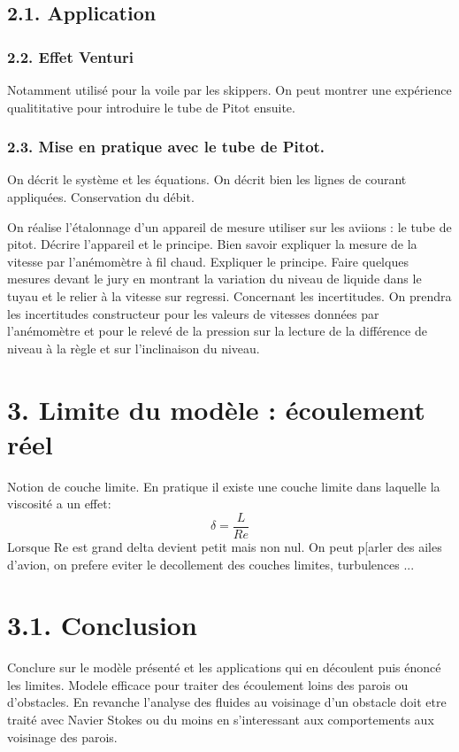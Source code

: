 \documentclass[french, a4paper, 10pt, twocolumn, landscape]{article}
\begin{document}
\subsection*{2.1. Application}

\subsubsection*{2.2. Effet Venturi}

Notamment utilisé pour la voile par les skippers. On peut montrer une expérience qualititative pour introduire le tube de Pitot ensuite.

\subsubsection*{2.3. Mise en pratique avec le tube de Pitot.}
 On décrit le système et les équations. On décrit bien les lignes de courant appliquées. Conservation du débit.

On réalise l'étalonnage d'un appareil de mesure utiliser sur les aviions : le tube de pitot. Décrire l'appareil et le principe. Bien savoir expliquer la mesure de la vitesse par l'anémomètre à fil chaud. Expliquer le principe.  Faire quelques mesures devant le jury en montrant la variation du niveau de liquide dans le tuyau et le relier à la vitesse sur regressi. Concernant les incertitudes. On prendra les incertitudes constructeur pour les valeurs de vitesses données par l'anémomètre et pour le relevé de la pression sur la lecture de la différence de niveau à la règle et sur l'inclinaison du niveau.

\section*{3. Limite du modèle : écoulement réel}
Notion de couche limite. En pratique il existe une couche limite dans laquelle la viscosité a un effet: 
\begin{equation}
  \delta = \dfrac{L}{Re}
\end{equation}
 Lorsque Re est grand delta devient petit mais non nul. On peut p[arler des ailes d'avion, on prefere eviter le decollement des couches limites, turbulences ...  

\section*{3.1. Conclusion}

Conclure sur le modèle présenté et les applications qui en découlent puis énoncé les limites. Modele efficace pour traiter des écoulement loins des parois ou d'obstacles. En revanche l'analyse des fluides au voisinage d'un obstacle doit etre traité avec Navier Stokes ou du moins en s'interessant aux comportements aux voisinage des parois.
\end{document}
